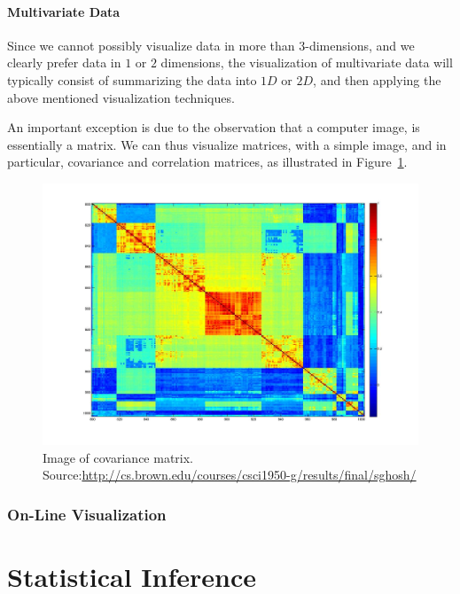 \documentclass[12pt,a4paper]{report}
\begin{document}

\subsubsection{Multivariate Data}
Since we cannot possibly visualize data in more than $3$-dimensions, and we clearly prefer data in $1$ or $2$ dimensions, the visualization of multivariate data will typically consist of summarizing the data into $1D$ or $2D$, and then applying the above mentioned visualization techniques.

An important exception is due to the observation that a computer image, is essentially a matrix. 
We can thus visualize matrices, with a simple image, and in particular, covariance and correlation matrices, as illustrated in Figure~\ref{fig:covariance_image}.

\begin{figure}
\centering
\includegraphics[height=0.3\textheight]{art/covarianceSupervised}
\caption[Covariance Matrix]{Image of covariance matrix. Source:\url{http://cs.brown.edu/courses/csci1950-g/results/final/sghosh/}}
\label{fig:covariance_image}
\end{figure}




\subsection{On-Line Visualization}



\chapter{Statistical Inference} 
\end{document}
